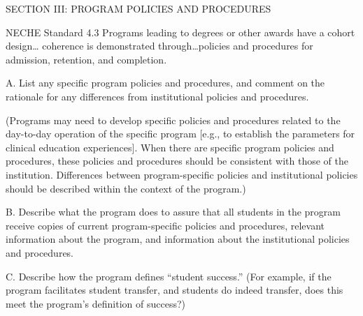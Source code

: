 SECTION III: PROGRAM POLICIES AND PROCEDURES

NECHE Standard 4.3 Programs leading to degrees or other awards have a cohort design… coherence is demonstrated through…policies and procedures for admission, retention, and completion.



A. List any specific program policies and procedures, and comment on the rationale for any differences from institutional policies and procedures.

(Programs may need to develop specific policies and procedures related to the day-to-day operation of the specific program [e.g., to establish the parameters for clinical education experiences]. When there are specific program policies and procedures, these policies and procedures should be consistent with those of the institution. Differences between program-specific policies and institutional policies should be described within the context of the program.)






B. Describe what the program does to assure that all students in the program receive copies of current program-specific policies and procedures, relevant information about the program, and information about the institutional policies and procedures.








C. Describe how the program defines “student success.” (For example, if the program facilitates student transfer, and students do indeed transfer, does this meet the program’s definition of success?) 

